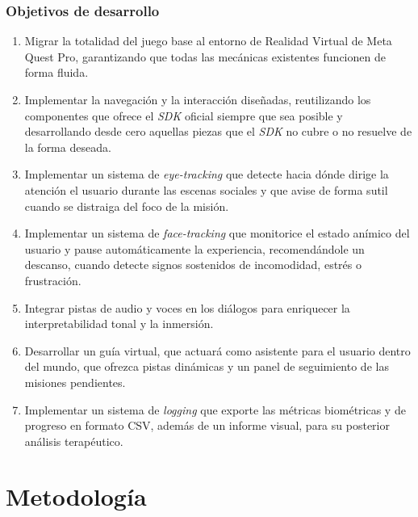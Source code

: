 \documentclass[12pt,twoside,titlepage]{report}
\begin{document}
\subsubsection{Objetivos de desarrollo}

\begin{enumerate}[label=\textbf{\arabic*.}, leftmargin=1.5cm, itemsep=0.4em]
  \item Migrar la totalidad del juego base al entorno de Realidad Virtual de Meta Quest Pro, garantizando que todas las mecánicas existentes funcionen de forma fluida.
  \item Implementar la navegación y la interacción diseñadas, reutilizando los componentes que ofrece el \textit{SDK} oficial siempre que sea posible y desarrollando desde cero aquellas piezas que el \textit{SDK} no cubre o no resuelve de la forma deseada.
  \item Implementar un sistema de \textit{eye-tracking} que detecte hacia dónde dirige la atención el usuario durante las escenas sociales y que avise de forma sutil cuando se distraiga del foco de la misión.
  \item Implementar un sistema de \textit{face-tracking} que monitorice el estado anímico del usuario y pause automáticamente la experiencia, recomendándole un descanso, cuando detecte signos sostenidos de incomodidad, estrés o frustración.
  \item Integrar pistas de audio y voces en los diálogos para enriquecer la interpretabilidad tonal y la inmersión.
  \item Desarrollar un guía virtual, que actuará como asistente para el usuario dentro del mundo, que ofrezca pistas dinámicas y un panel de seguimiento de las misiones pendientes.
  \item Implementar un sistema de \textit{logging} que exporte las métricas biométricas y de progreso en formato CSV, además de un informe visual, para su posterior análisis terapéutico.
\end{enumerate}

\section{Metodología}
\end{document}

